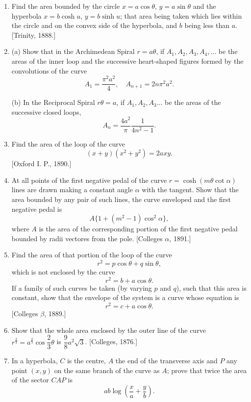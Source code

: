 \documentclass[11pt, a4paper]{article}
\newcommand{\source}[1]{\hfill\textnormal{[#1]}}
\begin{document}
\begin{enumerate}[leftmargin=2em]
\item Find the area bounded by the circle $x=a\cos\theta$, $y=a\sin\theta$ and the hyperbola $x=b\cosh u$, $y=b\sinh u$; that area being taken which lies within the circle and on the convex side of the hyperbola, and $b$ being less than $a$. \source{Trinity, 1888.}

\item (a) Show that in the Archimedean Spiral $r=a\theta$, if $A_1,A_2,A_3,A_4,\dots$ be the areas of the inner loop and the successive heart-shaped figures formed by the convolutions of the curve
\[
A_1=\frac{\pi^2a^2}{4},\quad A_{n+1}=2n\pi^2a^2.
\]

(b) In the Reciprocal Spiral $r\theta=a$, if $A_1,A_2,A_3\dots$ be the areas of the successive closed loops,
\[
A_n=\frac{4a^2}{\pi}\frac{1}{4n^2-1}.
\]

\item Find the area of the loop of the curve
\[
(x+y)(x^2+y^2)=2axy.
\]
\source{Oxford I. P., 1890.}

\item At all points of the first negative pedal of the curve $r=\cosh(m\theta\cot\alpha)$ lines are drawn making a constant angle $\alpha$ with the tangent. Show that the area bounded by any pair of such lines, the curve enveloped and the first negative pedal is
\[
A\{1+(m^2-1)\cos^2\alpha\},
\]
where $A$ is the area of the corresponding portion of the first negative pedal bounded by radii vectores from the pole. \source{Colleges $\alpha$, 1891.}

\item Find the area of that portion of the loop of the curve
\[
r^2=p\cos\theta+q\sin\theta,
\]
which is not enclosed by the curve
\[
r^2=b+a\cos\theta.
\]
If a family of such curves be taken (by varying $p$ and $q$), such that this area is constant, show that the envelope of the system is a curve whose equation is
\[
r^2=c+a\cos\theta.
\]
\source{Colleges $\beta$, 1889.}

\item Show that the whole area enclosed by the outer line of the curve $r^{\frac23}=a^{\frac23}\cos\dfrac23\theta$ is $\dfrac98a^2\sqrt3$. \source{Colleges, 1876.}

\item In a hyperbola, $C$ is the centre, $A$ the end of the transverse axis and $P$ any point $(x,y)$ on the same branch of the curve as $A$; prove that twice the area of the sector $CAP$ is
\[
ab\log\left(\frac{x}{a}+\frac{y}{b}\right).
\]


\end{enumerate}
\end{document}
